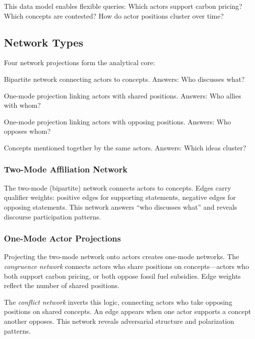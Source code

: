 \documentclass[../main.tex]{subfiles}
\begin{document}
\noindent This data model enables flexible queries: Which actors support carbon pricing? Which concepts are contested? How do actor positions cluster over time?

\subsection{Network Types}

Four network projections form the analytical core:

\begin{description}[leftmargin=0.5cm, itemsep=0.3em]
\item[Two-Mode Affiliation] Bipartite network connecting actors to concepts. Answers: Who discusses what?

\item[Actor Congruence] One-mode projection linking actors with shared positions. Answers: Who allies with whom?

\item[Actor Conflict] One-mode projection linking actors with opposing positions. Answers: Who opposes whom?

\item[Concept Co-occurrence] Concepts mentioned together by the same actors. Answers: Which ideas cluster?
\end{description}

\subsubsection{Two-Mode Affiliation Network}

The two-mode (bipartite) network connects actors to concepts. Edges carry qualifier weights: positive edges for supporting statements, negative edges for opposing statements. This network answers ``who discusses what'' and reveals discourse participation patterns.

\subsubsection{One-Mode Actor Projections}

Projecting the two-mode network onto actors creates one-mode networks. The \emph{congruence network} connects actors who share positions on concepts---actors who both support carbon pricing, or both oppose fossil fuel subsidies. Edge weights reflect the number of shared positions.

The \emph{conflict network} inverts this logic, connecting actors who take opposing positions on shared concepts. An edge appears when one actor supports a concept another opposes. This network reveals adversarial structure and polarization patterns.
\end{document}
